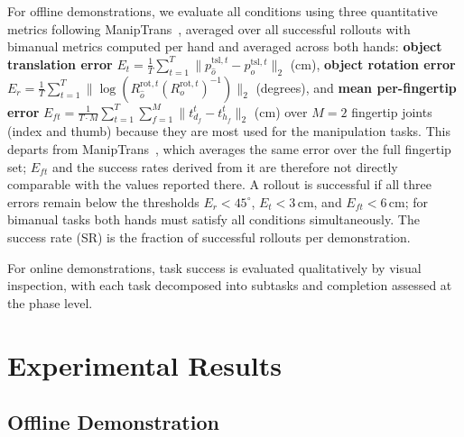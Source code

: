 For offline demonstrations, we evaluate all conditions using three quantitative metrics following ManipTrans~\cite{maniptrans}, averaged over all successful rollouts with bimanual metrics computed per hand and averaged across both hands: \textbf{object translation error} $E_t = \frac{1}{T}\sum_{t=1}^{T}\|p^{\mathrm{tsl},t}_{\hat{o}} - p^{\mathrm{tsl},t}_{o}\|_2$ (cm), \textbf{object rotation error} $E_r = \frac{1}{T}\sum_{t=1}^{T}\|\log(R^{\mathrm{rot},t}_{\hat{o}}(R^{\mathrm{rot},t}_{o})^{-1})\|_2$ (degrees),  and \textbf{mean per-fingertip error} $E_{ft} = \frac{1}{T \cdot M}\sum_{t=1}^{T}\sum_{f=1}^{M}\|t^t_{d_f} - t^t_{h_f}\|_2$ (cm) over $M{=}2$ fingertip joints (index and thumb) because they are most used for the manipulation tasks. This departs from ManipTrans~\cite{maniptrans}, which averages the same error over the full fingertip set; $E_{ft}$ and the success rates derived from it are therefore not directly comparable with the values reported there. A rollout is successful if all three errors remain below the thresholds $E_r < 45^\circ$, $E_t < 3$\,cm, and $E_{ft} < 6$\,cm; for bimanual tasks both hands must satisfy all conditions simultaneously. The success rate (SR) is the fraction of successful rollouts per demonstration.

For online demonstrations, task success is evaluated qualitatively by visual inspection, with each task decomposed into subtasks and completion assessed at the phase level.


\section{Experimental Results}
\subsection{Offline Demonstration}
\label{offline_eval}

